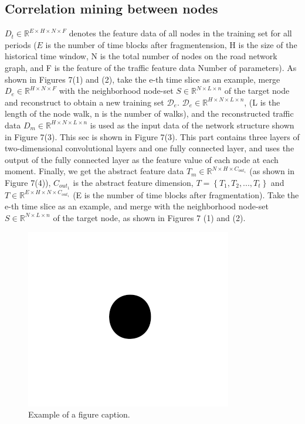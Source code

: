 \documentclass[conference]{IEEEtran}
\begin{document}
\subsection{Correlation mining between nodes}
$D_t \in \mathbb{R} ^{E \times H \times N \times F}$ denotes the feature data of all nodes in the training set for all periods ($E$ is the number of time blocks after fragmentension, H is the size of the historical time window, N is the total number of nodes on the road network graph, and F is the feature of the traffic feature data Number of parameters). As shown in Figures 7(1) and (2), take the e-th time slice as an example, merge $D_e \in \mathbb{R} ^{H \times N \times F}$ with the neighborhood node-set $S \in \mathbb{R} ^ {N \times L \times n}$ of the target node and reconstruct to obtain a new training set $\mathcal{D}_e$. $\mathcal{D}_e \in \mathbb{R} ^{H \times N \times L \times n}$, (L is the length of the node walk, n is the number of walks), and the reconstructed traffic data $D_m \in \mathbb{R} ^ {H \times N \times L \times n}$ is used as the input data of the network structure shown in Figure 7(3). This sec is shown in Figure 7(3). This part contains three layers of two-dimensional convolutional layers and one fully connected layer, and uses the output of the fully connected layer as the feature value of each node at each moment. Finally, we get the abstract feature data $T_m \in \mathbb{R} ^{N \times H \times C_{out_1}}$ (as shown in Figure 7(4)), $C_{out_1}$ is the abstract feature dimension, $T = \left\{T_1,T_2,... ,T_t\right\}$ and $T \in \mathbb{R} ^ {E \times H \times N \times C_{out_1}}$ (E is the number of time blocks after fragmentation).
Take the e-th time slice as an example, and merge with the neighborhood node-set $S \in \mathbb{R} ^ {N \times L \times n}$ of the target node, as shown in Figures 7 (1) and (2).

\begin{figure}[htbp]
    \centerline{\includegraphics{fig1.png}}
    \caption{Example of a figure caption.}
    \label{fig}
\end{figure}
\end{document}
